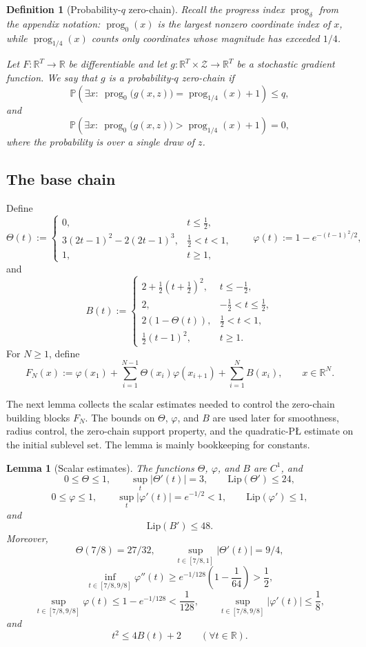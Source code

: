 \documentclass[11pt]{article}
\newtheorem{lemma}[theorem]{Lemma}
\newtheorem{definition}[theorem]{Definition}
\newcommand{\R}{\mathbb{R}}
\newcommand{\Pbb}{\mathbb{P}}
\newcommand{\prog}{\operatorname{prog}}
\begin{document}
\begin{definition}[Probability-$q$ zero-chain]
\label{def:probability-zero-chain}
Recall the progress index \(\prog_\delta\) from the appendix notation: \(\prog_0(x)\) is the largest nonzero coordinate
index of \(x\), while \(\prog_{1/4}(x)\) counts only coordinates whose magnitude has exceeded \(1/4\).

Let $F:\R^T\to\R$ be differentiable and let $g:\R^T\times \mathcal Z\to\R^T$ be a stochastic gradient function.
We say that $g$ is a probability-$q$ zero-chain if
\[
\Pbb\!\left(\exists x:\ \prog_0\bigl(g(x,z)\bigr)=\prog_{1/4}(x)+1\right)\le q,
\]
and
\[
\Pbb\!\left(\exists x:\ \prog_0\bigl(g(x,z)\bigr)>\prog_{1/4}(x)+1\right)=0,
\]
where the probability is over a single draw of $z$.
\end{definition}

\subsection{The base chain}
\label{app:sto-base-chain}

Define
\[
\Theta(t):=
\begin{cases}
0, & t\le \frac12,\\[0.3em]
3(2t-1)^2-2(2t-1)^3, & \frac12<t<1,\\[0.3em]
1, & t\ge 1,
\end{cases}
\qquad
\varphi(t):=1-e^{-(t-1)^2/2},
\]
and
\[
B(t):=
\begin{cases}
2+\frac12\left(t+\frac12\right)^2, & t\le -\frac12,\\[0.6em]
2, & -\frac12<t\le \frac12,\\[0.3em]
2(1-\Theta(t)), & \frac12<t<1,\\[0.3em]
\frac12(t-1)^2, & t\ge 1.
\end{cases}
\]
For $N\ge 1$, define
\[
F_N(x):=\varphi(x_1)+\sum_{i=1}^{N-1}\Theta(x_i)\varphi(x_{i+1})+\sum_{i=1}^N B(x_i),
\qquad
x\in\R^N.
\]

The next lemma collects the scalar estimates needed to control the zero-chain building blocks \(F_N\).  The bounds on
\(\Theta\), \(\varphi\), and \(B\) are used later for smoothness, radius control, the zero-chain support property, and
the quadratic-P\L{} estimate on the initial sublevel set.  The lemma is mainly bookkeeping for constants.

\begin{lemma}[Scalar estimates]
\label{lem:scalar-estimates}
The functions $\Theta$, $\varphi$, and $B$ are $C^1$, and
\[
0\le \Theta\le 1,
\qquad
\sup_t |\Theta'(t)|=3,
\qquad
\mathrm{Lip}(\Theta')\le 24,
\]
\[
0\le \varphi\le 1,
\qquad
\sup_t |\varphi'(t)|=e^{-1/2}<1,
\qquad
\mathrm{Lip}(\varphi')\le 1,
\]
and
\[
\mathrm{Lip}(B')\le 48.
\]
Moreover,
\[
\Theta(7/8)=27/32,
\qquad
\sup_{t\in[7/8,1]}|\Theta'(t)|=9/4,
\]
\[
\inf_{t\in[7/8,9/8]}\varphi''(t)\ge e^{-1/128}\left(1-\frac{1}{64}\right)>\frac12,
\]
\[
\sup_{t\in[7/8,9/8]}\varphi(t)\le 1-e^{-1/128}<\frac{1}{128},
\qquad
\sup_{t\in[7/8,9/8]}|\varphi'(t)|\le \frac18,
\]
and
\[
t^2\le 4B(t)+2
\qquad
(\forall t\in\R).
\]
\end{lemma}
\end{document}
